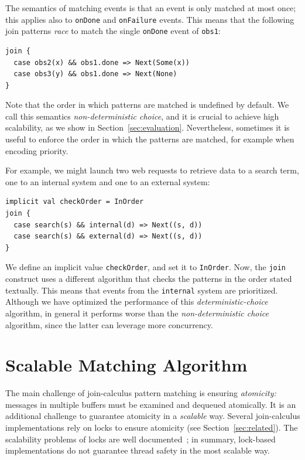 \documentclass[runningheads]{llncs}
\begin{document}
\begin{sloppypar}
\noindent
The semantics of matching events is that an event is only matched at most
once; this applies also to \verb|onDone| and \verb|onFailure| events. This
means that the following join patterns {\em race} to match the single
\verb|onDone| event of \verb|obs1|:

\begin{lstlisting}
join {
  case obs2(x) && obs1.done => Next(Some(x))
  case obs3(y) && obs1.done => Next(None)
}
\end{lstlisting}

\noindent
Note that the order in which patterns are matched is undefined by default. We
call this semantics \emph{non-deterministic choice}, and it is crucial to
achieve high scalability, as we show in Section~\ref{sec:evaluation}.
Nevertheless, sometimes it is useful to enforce the order in which the
patterns are matched, for example when encoding priority.

For example, we might launch two web requests to retrieve data to a search
term, one to an internal system and one to an external system:

\begin{lstlisting}
implicit val checkOrder = InOrder
join {
  case search(s) && internal(d) => Next((s, d))
  case search(s) && external(d) => Next((s, d))
}
\end{lstlisting}

\noindent
We define an implicit value \verb|checkOrder|, and set it to \verb|InOrder|.
Now, the \verb|join| construct uses a different algorithm that checks the
patterns in the order stated textually. This means that events from the
\verb|internal| system are prioritized. Although we have optimized the
performance of this {\em deterministic-choice} algorithm, in general it
performs worse than the {\em non-deterministic choice} algorithm, since the
latter can leverage more concurrency.


\section{Scalable Matching Algorithm}\label{sec:algorithm}

The main challenge of join-calculus pattern matching is ensuring {\em
atomicity:} messages in multiple buffers must be examined and dequeued
atomically. It is an additional challenge to guarantee atomicity in a {\em scalable}
way. Several join-calculus implementations rely on locks to ensure atomicity
(see Section~\ref{sec:related}). The scalability problems of locks are well
documented~\cite{Michael:1998}; in summary, lock-based implementations do not
guarantee thread safety in the most scalable way.


\end{sloppypar}
\end{document}
